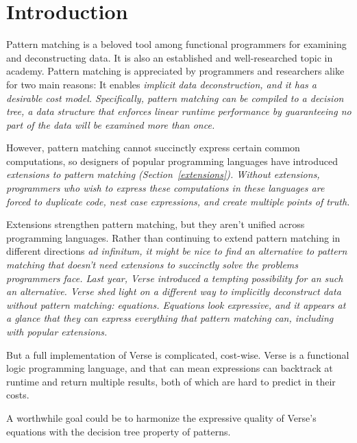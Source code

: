 \documentclass[manuscript,screen,review, 12pt, nonacm]{acmart}
\begin{document}
\section{Introduction}

Pattern matching is a beloved tool among functional programmers for examining
and deconstructing data. 
It is also an established and well-researched topic in
academy\cite{burton1993pattern, palao1996new, wadler1987views, macqueen1985tree,
bpc}. Pattern matching is appreciated by programmers and
researchers alike for two main reasons: It enables \it{implicit} data
deconstruction, and it has a desirable cost model. Specifically, pattern
matching can be compiled to a \it{decision tree}, a data structure that enforces
linear runtime performance by guaranteeing no part of the data will be examined
more than once.\cite{maranget}

However, pattern matching cannot succinctly express certain common computations,
so designers of popular programming languages have introduced \it{extensions} to
pattern matching (Section~\ref{extensions}). Without extensions, programmers who
wish to express these computations in these languages are forced to duplicate
code, nest \it{case} expressions, and create multiple points of truth. 

Extensions strengthen pattern matching, but they aren't unified across
programming languages. Rather than continuing to extend pattern matching in
different directions \it{ad infinitum}, it might be nice to find an alternative
to pattern matching that doesn't need extensions to succinctly solve the
problems programmers face. Last year, Verse\cite{verse} introduced
a tempting possibility for an such an alternative. Verse shed light on a
different way to implicitly deconstruct data without pattern matching:
\it{equations}. Equations look expressive, and it appears at a glance that they
can express everything that pattern matching can, including with popular
extensions. 

But a full implementation of Verse is complicated, cost-wise. Verse is a
functional logic programming language, and that can mean expressions can
backtrack at runtime and return multiple results, both of which are
hard to predict in their costs. 

A worthwhile goal could be to harmonize the expressive quality of Verse's
equations with the decision tree property of patterns.
\end{document}
